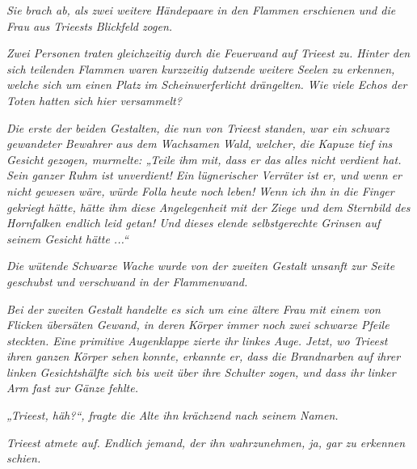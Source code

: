 \textit{Sie brach ab, als zwei weitere Händepaare in den Flammen erschienen und die Frau aus Trieests Blickfeld zogen.}\bigskip



\textit{Zwei Personen traten gleichzeitig durch die Feuerwand auf Trieest zu. Hinter den sich teilenden Flammen waren kurzzeitig dutzende weitere Seelen zu erkennen, welche sich um einen Platz im Scheinwerferlicht drängelten. Wie viele Echos der Toten hatten sich hier versammelt?}

\textit{Die erste der beiden Gestalten, die nun von Trieest standen, war ein schwarz gewandeter Bewahrer aus dem Wachsamen Wald, welcher, die Kapuze tief ins Gesicht gezogen, murmelte: „Teile ihm mit, dass er das alles nicht verdient hat. Sein ganzer Ruhm ist unverdient! Ein lügnerischer Verräter ist er, und wenn er nicht gewesen wäre, würde Folla heute noch leben! Wenn ich ihn in die Finger gekriegt hätte, hätte ihm diese Angelegenheit mit der Ziege und dem Sternbild des Hornfalken endlich leid getan! Und dieses elende selbstgerechte Grinsen auf seinem Gesicht hätte ...“}

\textit{Die wütende Schwarze Wache wurde von der zweiten Gestalt unsanft zur Seite geschubst und verschwand in der Flammenwand.}\bigskip



\textit{Bei der zweiten Gestalt handelte es sich um eine ältere Frau mit einem von Flicken übersäten Gewand, in deren Körper immer noch zwei schwarze Pfeile steckten. Eine primitive Augenklappe zierte ihr linkes Auge. Jetzt, wo Trieest ihren ganzen Körper sehen konnte, erkannte er, dass die Brandnarben auf ihrer linken Gesichtshälfte sich bis weit über ihre Schulter zogen, und dass ihr linker Arm fast zur Gänze fehlte.}

\textit{„Trieest, häh?“, fragte die Alte ihn krächzend nach seinem Namen.}

\textit{Trieest atmete auf. Endlich jemand, der ihn wahrzunehmen, ja, gar zu erkennen schien.}


